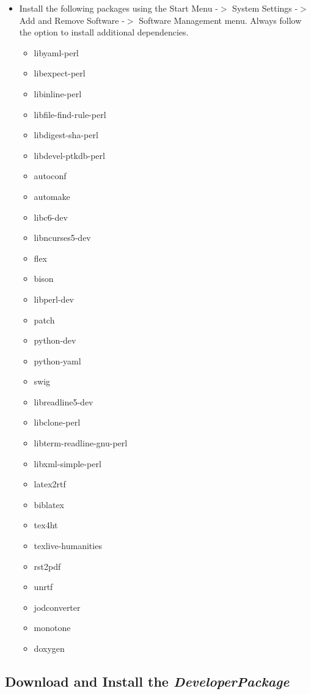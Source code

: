 \documentclass[12pt]{article}
\begin{document}
\begin{itemize}
\item[] Install the following packages using the Start Menu -$>$
  System Settings -$>$ Add and Remove Software -$>$ Software
  Management menu.  Always follow the option to install additional
  dependencies.
      \begin{itemize}
         \item libyaml-perl
         \item libexpect-perl
         \item libinline-perl
         \item libfile-find-rule-perl
         \item libdigest-sha-perl
         \item libdevel-ptkdb-perl
         \item autoconf
         \item automake
         \item libc6-dev
         \item libncurses5-dev
         \item flex
         \item bison
         \item libperl-dev
         \item patch
         \item python-dev
         \item python-yaml
         \item swig
         \item libreadline5-dev
         \item libclone-perl
         \item libterm-readline-gnu-perl
         \item libxml-simple-perl
         \item latex2rtf
         \item biblatex
         \item tex4ht
         \item texlive-humanities
         \item rst2pdf
         \item unrtf
         \item jodconverter
         \item monotone
         \item doxygen
      \end{itemize}
 \end{itemize}

\subsection*{Download and Install the {\it DeveloperPackage}}
\end{document}
